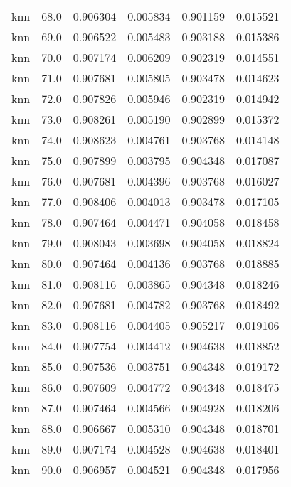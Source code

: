 \begin{tabular}{lrrrrr}
     knn &       68.0 &    0.906304 &   0.005834 &   0.901159 &  0.015521 \\
     knn &       69.0 &    0.906522 &   0.005483 &   0.903188 &  0.015386 \\
     knn &       70.0 &    0.907174 &   0.006209 &   0.902319 &  0.014551 \\
     knn &       71.0 &    0.907681 &   0.005805 &   0.903478 &  0.014623 \\
     knn &       72.0 &    0.907826 &   0.005946 &   0.902319 &  0.014942 \\
     knn &       73.0 &    0.908261 &   0.005190 &   0.902899 &  0.015372 \\
     knn &       74.0 &    0.908623 &   0.004761 &   0.903768 &  0.014148 \\
     knn &       75.0 &    0.907899 &   0.003795 &   0.904348 &  0.017087 \\
     knn &       76.0 &    0.907681 &   0.004396 &   0.903768 &  0.016027 \\
     knn &       77.0 &    0.908406 &   0.004013 &   0.903478 &  0.017105 \\
     knn &       78.0 &    0.907464 &   0.004471 &   0.904058 &  0.018458 \\
     knn &       79.0 &    0.908043 &   0.003698 &   0.904058 &  0.018824 \\
     knn &       80.0 &    0.907464 &   0.004136 &   0.903768 &  0.018885 \\
     knn &       81.0 &    0.908116 &   0.003865 &   0.904348 &  0.018246 \\
     knn &       82.0 &    0.907681 &   0.004782 &   0.903768 &  0.018492 \\
     knn &       83.0 &    0.908116 &   0.004405 &   0.905217 &  0.019106 \\
     knn &       84.0 &    0.907754 &   0.004412 &   0.904638 &  0.018852 \\
     knn &       85.0 &    0.907536 &   0.003751 &   0.904348 &  0.019172 \\
     knn &       86.0 &    0.907609 &   0.004772 &   0.904348 &  0.018475 \\
     knn &       87.0 &    0.907464 &   0.004566 &   0.904928 &  0.018206 \\
     knn &       88.0 &    0.906667 &   0.005310 &   0.904348 &  0.018701 \\
     knn &       89.0 &    0.907174 &   0.004528 &   0.904638 &  0.018401 \\
     knn &       90.0 &    0.906957 &   0.004521 &   0.904348 &  0.017956 \\

\end{tabular}
